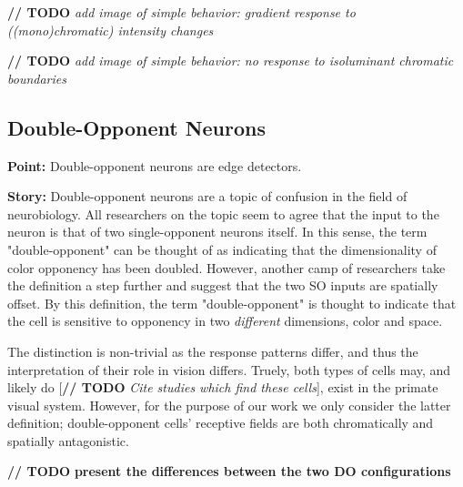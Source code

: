 \documentclass[journal,onecolumn]{IEEEtran}
\begin{document}
\textbf{// TODO} \textit{add image of simple behavior: gradient response to ((mono)chromatic) intensity changes}

\textbf{// TODO} \textit{add image of simple behavior: no response to isoluminant chromatic boundaries}

\subsection*{Double-Opponent Neurons}

\textbf{Point:}
Double-opponent neurons are edge detectors. 

\textbf{Story:}
Double-opponent neurons are a topic of confusion in the field of neurobiology. All researchers on the topic seem to agree that the input to the neuron is that of two single-opponent neurons itself. In this sense, the term "double-opponent" can be thought of as indicating that the dimensionality of color opponency has been doubled. However, another camp of researchers take the definition a step further and suggest that the two SO inputs are spatially offset. By this definition, the term "double-opponent" is thought to indicate that the cell is sensitive to opponency in two \textit{different} dimensions, color and space.

The distinction is non-trivial as the response patterns differ, and thus the interpretation of their role in vision differs. Truely, both types of cells may, and likely do [\textbf{// TODO} \textit{Cite studies which find these cells}], exist in the primate visual system. However, for the purpose of our work we only consider the latter definition; double-opponent cells' receptive fields are both chromatically and spatially antagonistic.

\textbf{// TODO} \textbf{present the differences between the two DO configurations}
\end{document}
